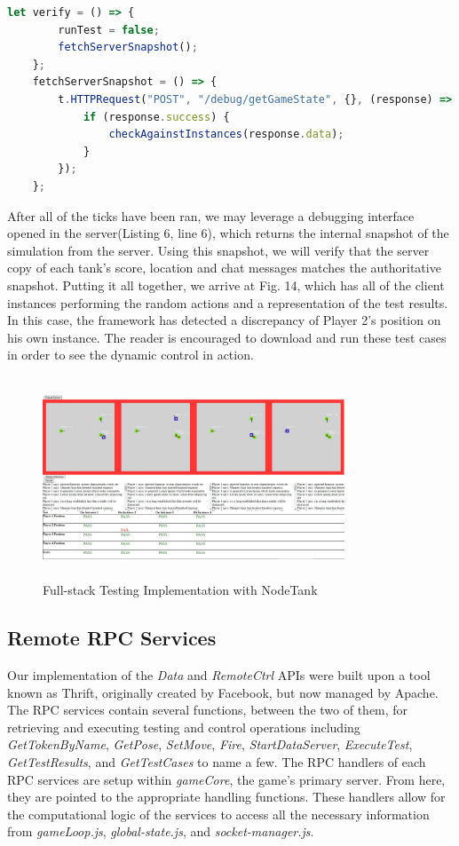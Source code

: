 \documentclass[conference]{IEEEtran}
\begin{document}
\begin{lstlisting}[language=JavaScript,caption={Snippet of Verification Code}]
    let verify = () => {
        runTest = false;
        fetchServerSnapshot();
    };
	fetchServerSnapshot = () => {
        t.HTTPRequest("POST", "/debug/getGameState", {}, (response) => {
            if (response.success) {
                checkAgainstInstances(response.data);
            }
        });
    };
\end{lstlisting}

After all of the ticks have been ran, we may leverage a debugging interface opened in the server(Listing 6, line 6), which returns the internal snapshot of the simulation from the server. 
Using this snapshot, we will verify that the server copy of each tank's score, location and chat messages matches the authoritative snapshot. Putting it all together, we arrive at Fig. 14, which 
has all of the client instances performing the random actions and a representation of the test results. In this case, the framework has detected a discrepancy of Player 2's position on his own
instance. The reader is encouraged to download and run these test cases in order to see the dynamic control in action.

\begin{figure}[htbp]
\centerline{\includegraphics [width = 9cm, height = 6cm] {images/FullFullStackTesting.jpg}}
\caption{Full-stack Testing Implementation with NodeTank}
\end{figure}


\subsection{Remote RPC Services}
Our implementation of the \textit{Data} and \textit{RemoteCtrl} APIs were built upon a tool known as Thrift, originally created by Facebook, but now managed by Apache. The RPC services contain several functions, between the two of them, for retrieving and executing testing and control operations including \textit{GetTokenByName}, \textit{GetPose}, \textit{SetMove}, \textit{Fire}, \textit{StartDataServer}, \textit{ExecuteTest}, \textit{GetTestResults}, and \textit{GetTestCases} to name a few. The RPC handlers of each RPC services are setup within \textit{gameCore}, the game's primary server. From here, they are pointed to the appropriate handling functions. These handlers allow for the computational logic of the services to access all the necessary information from \textit{gameLoop.js}, \textit{global-state.js}, and \textit{socket-manager.js}.
\end{document}
